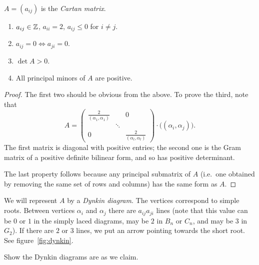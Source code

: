 \begin{definition}
$A = (a_{ij})$ is the \emph{Cartan matrix}.
\end{definition}

\begin{properties}\leavevmode
\begin{enumerate}
  \item $a_{ij} \in \mathbb{Z}$, $a_{ii} = 2$, $a_{ij} \leq 0$ for $i \neq j$.
  \item $a_{ij} = 0 \iff a_{ji} = 0$.
  \item $\det A > 0$.
  \item All principal minors of $A$ are positive.
\end{enumerate}
\end{properties}

\begin{proof}
The first two should be obvious from the above. To prove the third, note that
\[
  A = \begin{pmatrix}
        \frac{2}{(\alpha_1, \alpha_1)} & & 0\\
        & \ddots & \\
        0 & & \frac{2}{(\alpha_l, \alpha_l)}
      \end{pmatrix}
      \cdot \bigl((\alpha_i, \alpha_j)\bigr).
\]
The first matrix is diagonal with positive entries; the second one is the Gram
matrix of a positive definite bilinear form, and so has positive determinant.

The last property follows because any principal submatrix of $A$ (i.e.\ one
obtained by removing the same set of rows and columns) has the same form as
$A$.
\end{proof}

We will represent $A$ by a \emph{Dynkin diagram}. The vertices correspond to
simple roots. Between vertices $\alpha_i$ and $\alpha_j$ there are
$a_{ij}a_{ji}$ lines (note that this value can be $0$ or $1$ in the simply
laced diagrams, may be $2$ in $B_n$ or $C_n$, and may be $3$ in $G_2$). If
there are $2$ or $3$ lines, we put an arrow pointing towards the short root.
See figure~\ref{fig:dynkin}.

\begin{exercise}
Show the Dynkin diagrams are as we claim.
\end{exercise}

